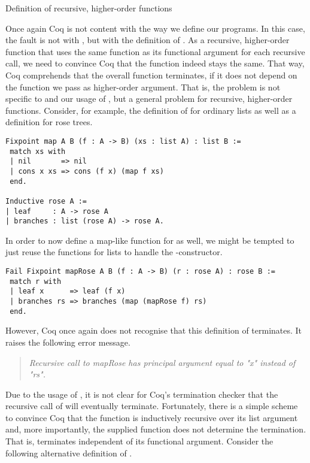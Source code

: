 \begin{excursus}{Definition of recursive, higher-order functions}

Once again Coq is not content with the way we define our programs.
In this case, the fault is not with , but with the definition of .
As a recursive, higher-order function that uses the same function as its functional argument for each recursive call, we need to convince Coq that the function indeed stays the same.
That way, Coq comprehends that the overall function terminates, if it does not depend on the function we pass as higher-order argument.
That is, the problem is not specific to  and our usage of , but a general problem for recursive, higher-order functions.
Consider, for example, the definition of  for ordinary lists as well as a definition for rose trees.

\begin{verbatim}
Fixpoint map A B (f : A -> B) (xs : list A) : list B :=
 match xs with
 | nil       => nil
 | cons x xs => cons (f x) (map f xs)
 end.

Inductive rose A :=
| leaf     : A -> rose A
| branches : list (rose A) -> rose A.
\end{verbatim}

In order to now define a map-like function for  as well, we might be tempted to just reuse the  functions for lists to handle the -constructor.

\begin{verbatim}
Fail Fixpoint mapRose A B (f : A -> B) (r : rose A) : rose B :=
 match r with
 | leaf x      => leaf (f x)
 | branches rs => branches (map (mapRose f) rs)
 end.
\end{verbatim}

However, Coq once again does not recognise that this definition of  terminates.
It raises the following error message.

\begin{quote}
\emph{Recursive call to mapRose has principal argument equal to "x" instead of "rs".}
\end{quote}

Due to the usage of , it is not clear for Coq's termination checker that the recursive call of  will eventually terminate.
Fortunately, there is a simple scheme to convince Coq that the function  is inductively recursive over its list argument and, more importantly, the supplied function does not determine the termination.
That is,  terminates independent of its functional argument.
Consider the following alternative definition of .


\end{excursus}
